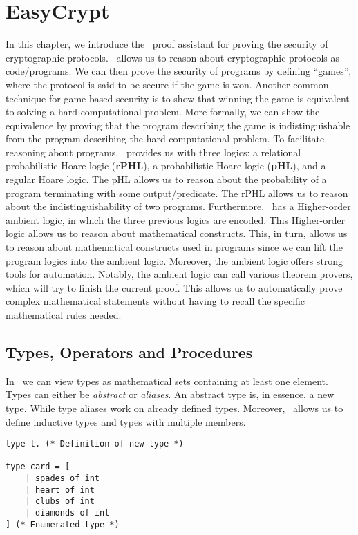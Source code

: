 \chapter{EasyCrypt}
\label{ch:EasyCrypt}
In this chapter, we introduce the \easycrypt\ proof assistant for proving the security
of cryptographic protocols. \easycrypt\ allows us to reason about cryptographic
protocols as code/programs. We can then prove the security of programs by defining
``games'', where the protocol is said to be secure if the game is won.
Another common technique for game-based security is to show that winning the game is
equivalent to solving a hard computational problem. More formally, we can show
the equivalence by proving that the program describing the game is indistinguishable
from the program describing the hard computational problem.
To facilitate reasoning about programs, \easycrypt\ provides us with three
logics: a relational probabilistic
Hoare logic (\textbf{rPHL}), a probabilistic Hoare logic (\textbf{pHL}), and a
regular Hoare logic.
The pHL allows us to reason about the probability of a program terminating with
some output/predicate.
The rPHL allows us to reason about the
indistinguishability of two programs.
Furthermore, \easycrypt\ has a Higher-order ambient logic, in which the three
previous logics are encoded.
This Higher-order logic allows us to reason about mathematical constructs. This,
in turn, allows us to reason about mathematical constructs used in programs
since we can lift the program logics into the ambient logic.
Moreover, the ambient logic offers strong tools for automation. Notably, the
ambient logic can call various theorem provers, which will try to finish the
current proof. This allows us to automatically prove complex mathematical
statements without having to recall the specific mathematical rules needed.

\section{Types, Operators and Procedures}
\label{sec:ec_types_and_operators}
In \easycrypt\ we can view types as mathematical sets containing at least one
element. Types can either be \textit{abstract} or \textit{aliases}. An abstract
type is, in essence, a new type. While type aliases work on already defined
types.
Moreover, \easycrypt\ allows us to define inductive types and types with
multiple members.
\begin{lstlisting}
type t. (* Definition of new type *)

type card = [
    | spades of int
    | heart of int
    | clubs of int
    | diamonds of int
] (* Enumerated type *)
\end{lstlisting}

